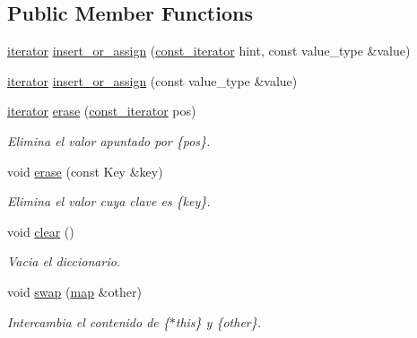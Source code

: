 \subsection*{\-Public \-Member \-Functions}
\begin{DoxyCompactItemize}
\item 
\hyperlink{classaed2_1_1iterator_1_1iterator}{iterator} \hyperlink{classaed2_1_1iterator_aab34e7001b3ee3ce79da8ea24d7e6351}{insert\-\_\-or\-\_\-assign} (\hyperlink{classaed2_1_1iterator_1_1const__iterator}{const\-\_\-iterator} hint, const value\-\_\-type \&value)
\item 
\hyperlink{classaed2_1_1iterator_1_1iterator}{iterator} \hyperlink{classaed2_1_1iterator_af131c4b0d89978372a0c8ce38bf8f33e}{insert\-\_\-or\-\_\-assign} (const value\-\_\-type \&value)
\item 
\hyperlink{classaed2_1_1iterator_1_1iterator}{iterator} \hyperlink{classaed2_1_1iterator_adf371aaec9e68bd4a4d5a889d0b6b679}{erase} (\hyperlink{classaed2_1_1iterator_1_1const__iterator}{const\-\_\-iterator} pos)
\begin{DoxyCompactList}\small\item\em \-Elimina el valor apuntado por \{pos\}. \end{DoxyCompactList}\item 
void \hyperlink{classaed2_1_1iterator_a0a0e62b2a2c0fb98f431164c66a6e388}{erase} (const \-Key \&key)
\begin{DoxyCompactList}\small\item\em \-Elimina el valor cuya clave es \{key\}. \end{DoxyCompactList}\item 
void \hyperlink{classaed2_1_1iterator_ac98b533e402839c99d33d3118906c38f}{clear} ()
\begin{DoxyCompactList}\small\item\em \-Vacia el diccionario. \end{DoxyCompactList}\item 
void \hyperlink{classaed2_1_1iterator_a8ec2215b2dfaf6ddd57b1e0b00d8d3d2}{swap} (\hyperlink{classaed2_1_1map}{map} \&other)
\begin{DoxyCompactList}\small\item\em \-Intercambia el contenido de \{$\ast$this\} y \{other\}. \end{DoxyCompactList}\end{DoxyCompactItemize}

